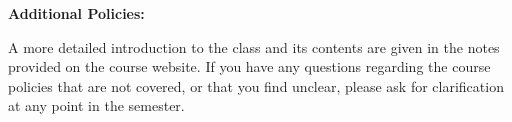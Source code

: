 \documentclass[12pt, a4paper]{article}
\begin{document}
\bigskip

\textbf{Additional Policies:} \vspace{6pt}


A more detailed introduction to the class and its contents are given in the notes provided
on the course website. If you have any questions regarding the course policies that are not
covered, or that you find unclear, please ask for clarification at any point in the
semester.
\end{document}
